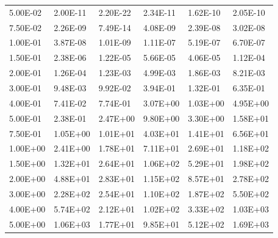 \begin{table}[]
\begin{center}
\begin{threeparttable}
\begin{tabular}{@{}llllll@{}}
5.00E-02 & 2.00E-11                & 2.20E-22                 & 2.34E-11                & 1.62E-10                & 2.05E-10          \\
7.50E-02 & 2.26E-09                & 7.49E-14                 & 4.08E-09                & 2.39E-08                & 3.02E-08          \\
1.00E-01 & 3.87E-08                & 1.01E-09                 & 1.11E-07                & 5.19E-07                & 6.70E-07          \\
1.50E-01 & 2.38E-06                & 1.22E-05                 & 5.66E-05                & 4.06E-05                & 1.12E-04          \\
2.00E-01 & 1.26E-04                & 1.23E-03                 & 4.99E-03                & 1.86E-03                & 8.21E-03          \\
3.00E-01 & 9.48E-03                & 9.92E-02                 & 3.94E-01                & 1.32E-01                & 6.35E-01          \\
4.00E-01 & 7.41E-02                & 7.74E-01                 & 3.07E+00                & 1.03E+00                & 4.95E+00          \\
5.00E-01 & 2.38E-01                & 2.47E+00                 & 9.80E+00                & 3.30E+00                & 1.58E+01          \\
7.50E-01 & 1.05E+00                & 1.01E+01                 & 4.03E+01                & 1.41E+01                & 6.56E+01          \\
1.00E+00 & 2.41E+00                & 1.78E+01                 & 7.11E+01                & 2.69E+01                & 1.18E+02          \\
1.50E+00 & 1.32E+01                & 2.64E+01                 & 1.06E+02                & 5.29E+01                & 1.98E+02          \\
2.00E+00 & 4.88E+01                & 2.83E+01                 & 1.15E+02                & 8.57E+01                & 2.78E+02          \\
3.00E+00 & 2.28E+02                & 2.54E+01                 & 1.10E+02                & 1.87E+02                & 5.50E+02          \\
4.00E+00 & 5.74E+02                & 2.12E+01                 & 1.02E+02                & 3.33E+02                & 1.03E+03          \\
5.00E+00 & 1.06E+03                & 1.77E+01                 & 9.85E+01                & 5.12E+02                & 1.69E+03          \\

\end{tabular}
\end{threeparttable}
\end{center}
\end{table}
